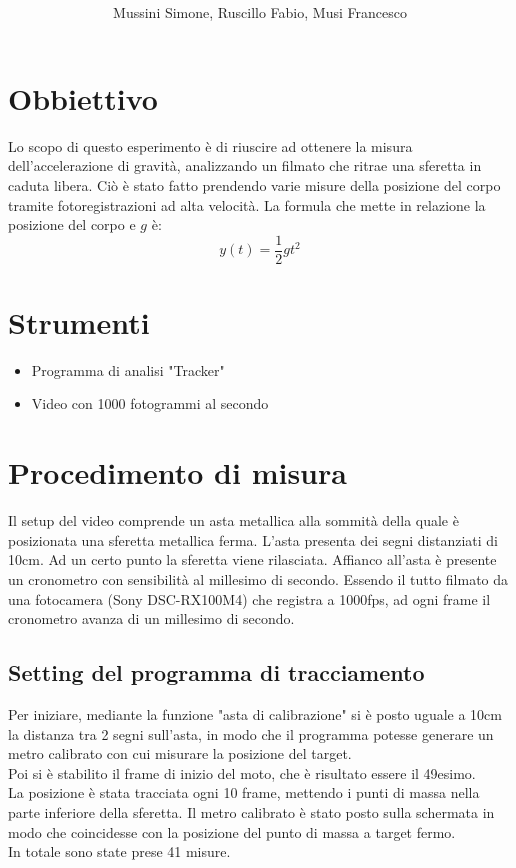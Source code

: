 \documentclass[12pt, a4paper]{article}
\title{\textbf{\scalebox{1.3}{\text{Moto di un grave lungo la verticale}}}}
\date{}
\author{\begin{small}Mussini Simone, Ruscillo Fabio, Musi Francesco\end{small}}
\begin{document}
\maketitle
\section{Obbiettivo}
Lo scopo di questo esperimento è di riuscire ad ottenere la misura dell'accelerazione di gravità, analizzando un filmato che ritrae una sferetta in caduta libera. 
Ciò è stato fatto prendendo varie misure della posizione del corpo tramite fotoregistrazioni ad alta velocità. 
La formula che mette in relazione la posizione del corpo e $g$ è:
\begin{equation*}
    y(t) = \frac{1}{2}gt^2
\end{equation*}


\section{Strumenti}
\begin{itemize}
\setlength\itemsep{0mm}
    \item Programma di analisi "Tracker"
    \item Video con 1000 fotogrammi al secondo
\end{itemize}

\section{Procedimento di misura}
Il setup del video comprende un asta metallica alla sommità della quale è posizionata una sferetta metallica ferma. L'asta presenta dei segni distanziati di 10cm. 
Ad un certo punto la sferetta viene rilasciata. Affianco all'asta è presente un cronometro con sensibilità al millesimo di secondo. 
Essendo il tutto filmato da una fotocamera (Sony DSC-RX100M4) che registra a 1000fps, ad ogni frame il cronometro avanza di un millesimo di secondo.

  
\subsection{Setting del programma di tracciamento}
Per iniziare, mediante la funzione "asta di calibrazione" si è posto uguale a 10cm la distanza tra 2 segni sull'asta, in modo che il programma potesse generare un metro calibrato con cui misurare la posizione del target. \\
Poi si è stabilito il frame di inizio del moto, che è risultato essere il 49esimo.  \\
La posizione è stata tracciata ogni 10 frame, mettendo i punti di massa nella parte inferiore della sferetta. Il metro calibrato è stato posto sulla schermata in modo che coincidesse con la posizione del punto di massa a target fermo.\\
In totale sono state prese 41 misure.
\end{document}
